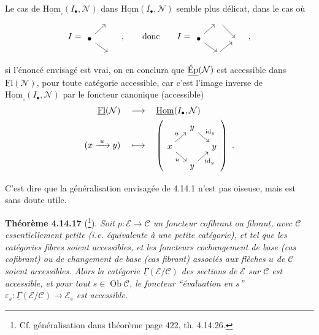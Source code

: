\documentclass[11pt]{article}
\newcommand{\printedpage}[1]{\marginpar{\footnotesize p.~#1}}
\newcommand{\msp}[1]{\marginpar{\footnotesize [#1]}}
\newcommand{\Ob}{\operatorname{Ob}}
\newcommand{\uHom}{\underline{\mathrm{Hom}}}
\newcommand{\uFl}{\underline{\mathrm{Fl}}}
\newcommand{\uEp}{\underline{\textup{Ép}}}
\newcommand{\uGamma}{\underline{\Gamma}}
\begin{document}
Le cas de $\uHom_{\square}(I_\bullet,\mathcal{N})$ dans $\uHom(I_\bullet,\mathcal{N})$ semble plus délicat, dans le cas où
\msp{page 390}
\[
I = 
\begin{tikzcd}[sep=small]
 & {} \\
\bullet \arrow[ur] \arrow[dr] & \\
 & {}
\end{tikzcd}
\quad , \qquad \text{donc} \qquad
I = 
\begin{tikzcd}[sep=small]
 & {} \arrow[dr] & \\
\bullet \arrow[ur] \arrow[dr] & & {} \\
 & {} \arrow[ur] &
\end{tikzcd}
\quad ,
\]
si l'énoncé envisagé est vrai, on en conclura que $\uEp(\mathcal{N})$ est accessible dans $\uFl(\mathcal{N})$, pour toute catégorie accessible, car c'est l'image inverse de $\uHom_{\square}(I_\bullet,\mathcal{N})$ par le foncteur canonique (accessible)
\[
\begin{aligned}
\uFl(\mathcal{N}) \quad &\longrightarrow \quad \uHom(I_\bullet,\mathcal{N}) \\
(x \xrightarrow{\ u\ } y) \quad &\longmapsto \quad
\left(
\begin{tikzcd}[sep=small, ampersand replacement=\&]
 \& y \arrow[dr, "\mathrm{id}_y"] \& \\
x \arrow[ur, "u"] \arrow[dr, "u"'] \& \& y \\
 \& y \arrow[ur, "\mathrm{id}_y"'] \&
\end{tikzcd}
\right) \ .
\end{aligned}
\]

\printedpage{148}

C'est dire que la généralisation envisagée de 4.14.1 n'est pas oiseuse, mais est sans doute utile.

\msp{page 391}
\textbf{Théorème 4.14.17} (\footnote[168]{Cf. généralisation dans théorème page 422, th. 4.14.26.}). \textit{Soit $p : \mathcal{E} \longrightarrow \mathcal{C}$ un foncteur cofibrant ou fibrant, avec $\mathcal{C}$ essentiellement petite (i.e. équivalente à une petite catégorie), et tel que les catégories fibres soient accessibles, et les foncteurs cochangement de base (cas cofibrant) ou de changement de base (cas fibrant) associés aux flèches $u$ de $\mathcal{C}$ soient accessibles. Alors la catégorie $\uGamma(\mathcal{E}/\mathcal{C})$ des sections de $\mathcal{E}$ sur $\mathcal{C}$ est accessible, et pour tout $s \in \Ob\mathcal{C}$, le foncteur ``évaluation en $s$'' $\varepsilon_s : \uGamma(\mathcal{E}/\mathcal{C}) \longrightarrow \mathcal{E}_s$ est accessible.}
\end{document}
